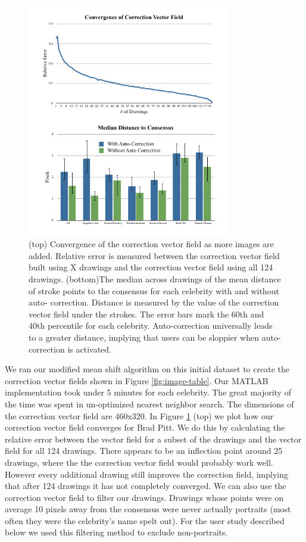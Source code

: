 \begin{figure}[!t]
  \centering%
\includegraphics[width=3.5in]{./figures/userstudy/twoGraph.pdf}
  \caption{(top) Convergence of the correction vector field as more images are added. Relative error is measured between
the correction vector field built using X drawings and the correction vector field using all 124 drawings. (bottom)The
median across drawings of the mean distance of stroke points to the consensus for each celebrity with and without auto-
correction. Distance is measured by the value of the correction vector field under the strokes. The error bars mark the
60th and 40th percentile for each celebrity. Auto-correction universally leads to a greater distance, implying that users
can be sloppier when auto-correction is activated.}
  \label{fig:daf-two}
\end{figure}



We ran our modified mean shift algorithm on this initial dataset to create the correction vector fields shown in Figure \ref{fig:image-table}. Our MATLAB implementation took under 5 minutes for each celebrity.  The great majority of the time was spent in un-optimized nearest neighbor search. The dimensions of the correction vector field are 460x320. In Figure \ref{fig:daf-two} (top) we plot how our correction vector field converges for Brad Pitt. We do this by calculating the relative error between the vector field for a subset of the drawings and the vector field for all 124 drawings. There appears to be an inflection point around 25 drawings, where the the correction vector field would probably work well. However every additional drawing still improves the correction field, implying that after 124 drawings it has not completely converged. We can also use the correction vector field to filter our drawings. Drawings whose points were on average 10 pixels away from the consensus were never actually portraits (most often they were the celebrity's name spelt out). For the user study described below we used this filtering method to exclude non-portraits. 


